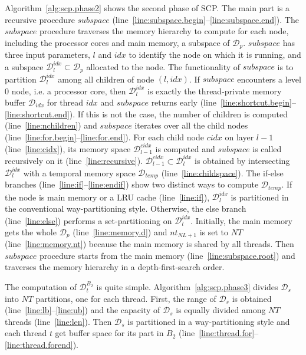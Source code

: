 Algorithm~\ref{alg:scp.phase2} shows the second phase of SCP.
The main part is a recursive procedure $subspace$
(line~\ref{line:subspace.begin}--\ref{line:subspace.end}).
The $subspace$ procedure traverses the memory hierarchy
to compute for each node, including the processor cores and main memory,
a subspace of $\mathcal{D}_p$.
$subspace$ has three input parameters, $l$ and $idx$ to
identify the node on which it is running,
and a subspace $\mathcal{D}_l^{idx} \subset \mathcal{D}_p$ allocated to the node. 
The functionality of $subspace$ is to partition $\mathcal{D}_l^{idx}$
among all children of node $(l, idx)$.
If $subspace$ encounters a level 0 node, i.e. a processor core,
then $\mathcal{D}_l^{idx}$ is exactly the thread-private
memory buffer $\mathcal{D}_{idx}$ for thread $idx$ and $subspace$ returns early
(line~\ref{line:shortcut.begin}--\ref{line:shortcut.end}).
If this is not the case, the number of children is computed (line~\ref{line:nchildren})
and $subspace$ iterates over all the child nodes
(line~\ref{line:for.begin}--\ref{line:for.end}).
For each child node $cidx$ on layer $l-1$ (line~\ref{line:cidx}),
its memory space $\mathcal{D}_{l-1}^{cidx}$ is computed
and $subspace$ is called recursively on it (line~\ref{line:recursive}).
$\mathcal{D}_{l-1}^{cidx} \subset \mathcal{D}_l^{idx}$ is obtained
by intersecting $\mathcal{D}_l^{idx}$ with
a temporal memory space $\mathcal{D}_{temp}$ (line~\ref{line:childspace}).
The if-else branches (line~\ref{line:if}--\ref{line:endif})
show two distinct ways to compute $\mathcal{D}_{temp}$.
If the node is main memory or a LRU cache (line~\ref{line:if}),
$\mathcal{D}_l^{idx}$ is partitioned in the conventional
way-partitioning style.
Otherwise, the else branch (line~\ref{line:else}) performs
a set-partitioning on $\mathcal{D}_l^{idx}$.
Initially, the main memory gets the whole $\mathcal{D}_p$ (line~\ref{line:memory.d})
and $nt_{NL+1}$ is set to $NT$ (line~\ref{line:memory.nt})
because the main memory is shared by all threads.
Then $subspace$ procedure starts from the main memory (line~\ref{line:subspace.root})
and traverses the memory hierarchy in a depth-first-search order.

The computation of $\mathcal{D}_t^{B_2}$ is quite simple.
Algorithm~\ref{alg:scp.phase3} divides $\mathcal{D}_s$
into $NT$ partitions, one for each thread.
First, the range of $\mathcal{D}_s$ is obtained
(line~\ref{line:lb}--\ref{line:ub}) and
the capacity of $\mathcal{D}_s$ is equally
divided among $NT$ threads (line~\ref{line:len}).
Then $\mathcal{D}_s$ is partitioned in a way-partitioning style
and each thread $t$ get buffer space for its part in $B_2$
(line~\ref{line:thread.for}--\ref{line:thread.forend}).

